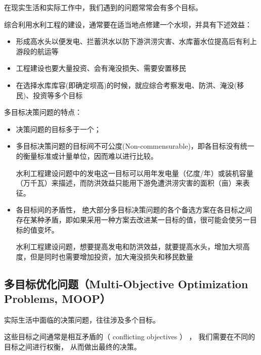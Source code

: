 在现实生活和实际工作中，我们遇到的问题常常会有多个目标。

\begin{example}
    综合利用水利工程的建设，通常要在适当地点修建一个水坝，并具有下述效益：

    \begin{itemize}[itemsep=0pt,parsep=0pt]
        \item 形成高水头以便发电、拦蓄洪水以防下游洪涝灾害、水库蓄水位提高后有利上游段的航运等
        \item 工程建设也要大量投资、会有淹没损失、需要安置移民
        \item 在选择水库库容(即确定坝高)的时候，就应综合考察发电、防洪、淹没(移民)、投资等多个目标
    \end{itemize}
\end{example}

多目标决策问题的特点：
\begin{itemize}[itemsep=0pt,parsep=0pt]
    \item 决策问题的目标多于一个；
    \item 多目标决策问题的目标间不可公度(Non-commensurable)，即各目标没有统一的衡量标准或计量单位，因而难以进行比较。

          \begin{example}
              水利工程建设问题中的发电这一目标可以用年发电量（亿度/年）或装机容量（万千瓦）来描述，而防洪效益只能用下游免遭洪涝灾害的面积（亩）来表征。
          \end{example}
    \item 各目标间的矛盾性， 绝大部分多目标决策问题的各个备选方案在各目标之间存在某种矛盾，即如果采用一种方案去改进某一目标的值，很可能会使另一目标的值变坏。
          \begin{example}
              水利工程建设问题，想要提高发电和防洪效益，就要提高水头，增加大坝高度，但是同时也需要增加投资，加大淹没损失和移民数量
          \end{example}
\end{itemize}

\subsection{多目标优化问题（Multi-Objective Optimization Problems, MOOP）}

实际生活中面临的决策问题，往往涉及多个目标。

这些目标之间通常是相互矛盾的（ conflicting objectives ） ， 我们需要在不同的目标之间进行权衡， 从而做出最终的决策。

